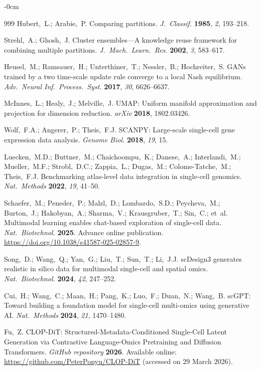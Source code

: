 \documentclass[11pt,a4paper]{article}
\newlength{\extralength}
\begin{document}
\begin{adjustwidth}{-\extralength}{0cm}
\begin{thebibliography}{999}
Hubert,~L.; Arabie,~P. Comparing partitions. {\em J.\ Classif.} {\bf 1985}, {\em 2}, 193--218.

Strehl,~A.; Ghosh,~J. Cluster ensembles---A knowledge reuse framework for combining multiple partitions. {\em J.\ Mach.\ Learn.\ Res.} {\bf 2002}, {\em 3}, 583--617.

Heusel,~M.; Ramsauer,~H.; Unterthiner,~T.; Nessler,~B.; Hochreiter,~S. GANs trained by a two time-scale update rule converge to a local Nash equilibrium. {\em Adv.\ Neural Inf.\ Process.\ Syst.} {\bf 2017}, {\em 30}, 6626--6637.

McInnes,~L.; Healy,~J.; Melville,~J. UMAP: Uniform manifold approximation and projection for dimension reduction. {\em arXiv} {\bf 2018}, 1802.03426.

Wolf,~F.A.; Angerer,~P.; Theis,~F.J. SCANPY: Large-scale single-cell gene expression data analysis. {\em Genome Biol.} {\bf 2018}, {\em 19}, 15.

Luecken,~M.D.; Buttner,~M.; Chaichoompu,~K.; Danese,~A.; Interlandi,~M.; Mueller,~M.F.; Strobl,~D.C.; Zappia,~L.; Dugas,~M.; Colome-Tatche,~M.; Theis,~F.J. Benchmarking atlas-level data integration in single-cell genomics. {\em Nat.\ Methods} {\bf 2022}, {\em 19}, 41--50.

Schaefer,~M.; Peneder,~P.; Malzl,~D.; Lombardo,~S.D.; Peycheva,~M.; Burton,~J.; Hakobyan,~A.; Sharma,~V.; Krausgruber,~T.; Sin,~C.; et~al. Multimodal learning enables chat-based exploration of single-cell data. {\em Nat.\ Biotechnol.} {\bf 2025}. Advance online publication. \url{https://doi.org/10.1038/s41587-025-02857-9}.

Song,~D.; Wang,~Q.; Yan,~G.; Liu,~T.; Sun,~T.; Li,~J.J. scDesign3 generates realistic in silico data for multimodal single-cell and spatial omics. {\em Nat.\ Biotechnol.} {\bf 2024}, {\em 42}, 247--252.

Cui,~H.; Wang,~C.; Maan,~H.; Pang,~K.; Luo,~F.; Duan,~N.; Wang,~B. scGPT: Toward building a foundation model for single-cell multi-omics using generative AI. {\em Nat.\ Methods} {\bf 2024}, {\em 21}, 1470--1480.

Fu,~Z. CLOP-DiT: Structured-Metadata-Conditioned Single-Cell Latent Generation via Contrastive Language-Omics Pretraining and Diffusion Transformers. {\em GitHub repository} {\bf 2026}. Available online: \url{https://github.com/PeterPonyu/CLOP-DiT} (accessed on 29 March 2026).


\end{thebibliography}
\end{adjustwidth}
\end{document}
